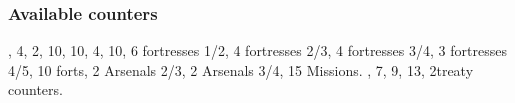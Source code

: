 \subsubsection{Available counters}
\ARMY, 4\FLEET, 2\corsaire, 10\LDND, 10\LD, 4\NTD,
10\LDENDE, 6 fortresses 1/2, 4 fortresses 2/3, 4 fortresses 3/4, 3
fortresses 4/5, 10 forts, 2 Arsenals 2/3, 2 Arsenals 3/4, 15 Missions.
\COL, 7\TP, 9\MNU, 13\TradeFLEET, 2\ROTW treaty
counters.

